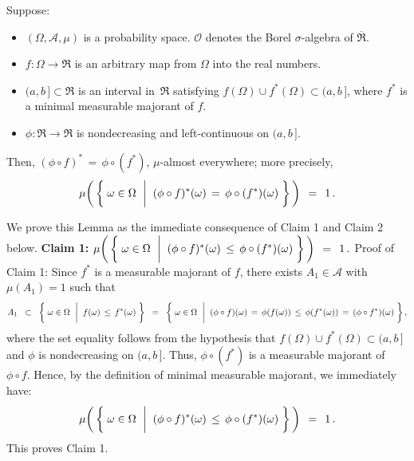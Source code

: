 \begin{lemma}
\mbox{}\vskip 0.1cm
\noindent
Suppose:
\begin{itemize}
\item
	$(\Omega,\mathcal{A},\mu)$ is a probability space.
	$\mathcal{O}$ denotes the Borel $\sigma$-algebra of $\overline{\Re}$.
\item
	$f : \Omega \longrightarrow \Re$ is an arbitrary map from $\Omega$ into the real numbers.
\item
	$(a,b\,] \subset \Re$ is an interval in \,$\Re$ satisfying $f(\Omega) \cup f^{*}(\Omega) \subset (a,b\,]$,
	where $f^{*}$ is a minimal measurable majorant of $f$.
\item
	$\phi : \Re \longrightarrow \Re$ is nondecreasing and left-continuous on $(a,b\,]$.
\end{itemize}
Then, $(\phi \circ f)^{*} \,=\, \phi \circ (f^{*})$, $\mu$-almost everywhere; more precisely,
\begin{equation*}
\mu\!\left(\,\left\{\;
	\omega \in \Omega
	\,\;\left\vert\;\;
	(\phi \circ f)^{*}(\omega) \,\overset{{\color{white}\vert}}{=}\, \phi \circ (f^{*})(\omega)
	\right.
\,\right\}\,\right)
\,\;=\;\, 1\,.
\end{equation*}
\end{lemma}
\proof
We prove this Lemma as the immediate consequence of Claim 1 and Claim 2 below.
\vskip 0.5cm
\noindent
\textbf{Claim 1:}\quad
$\mu\!\left(\,\left\{\;
	\omega \in \Omega
	\,\;\left\vert\;\;
	(\phi \circ f)^{*}(\omega) \,\overset{{\color{white}\vert}}{\leq}\, \phi \circ (f^{*})(\omega)
	\right.
\,\right\}\,\right)
\,\;=\;\, 1\,.
$
\vskip 0.2cm
\noindent
Proof of Claim 1:\;\;
Since $f^{*}$ is a measurable majorant of $f$,
there exists $A_{1} \in \mathcal{A}$ with $\mu(A_{1}) = 1$ such that
\begin{equation*}
A_{1}
\;\;\subset\;\;
	\left\{\;
		\omega \in \Omega
		\,\;\left\vert\;\;
		f(\omega) \,\overset{{\color{white}\vert}}{\leq}\, f^{*}(\omega)
	\right.
	\,\right\}
\;\; = \;\;
	\left\{\;
		\omega \in \Omega
		\,\;\left\vert\;\;
		(\phi \circ f)(\omega) \,=\, \phi(f(\omega)) \,\overset{{\color{white}\vert}}{\leq}\, \phi(f^{*}(\omega)) \,=\, (\phi \circ f^{*})(\omega)
	\right.
	\,\right\},
\end{equation*}
where the set equality follows from the hypothesis that $f(\Omega) \cup f^{*}(\Omega) \subset (a,b\,]$
and $\phi$ is nondecreasing on $(a,b\,]$.
Thus, $\phi \circ (f^{*})$ is a measurable majorant of $\phi \circ f$.
Hence, by the definition of minimal measurable majorant, we immediately have:
\begin{equation*}
\mu\!\left(\,\left\{\;
	\omega \in \Omega
	\,\;\left\vert\;\;
	(\phi \circ f)^{*}(\omega) \,\overset{{\color{white}\vert}}{\leq}\, \phi \circ (f^{*})(\omega)
	\right.
\,\right\}\,\right)
\,\;=\;\, 1\,.
\end{equation*}
This proves Claim 1.

